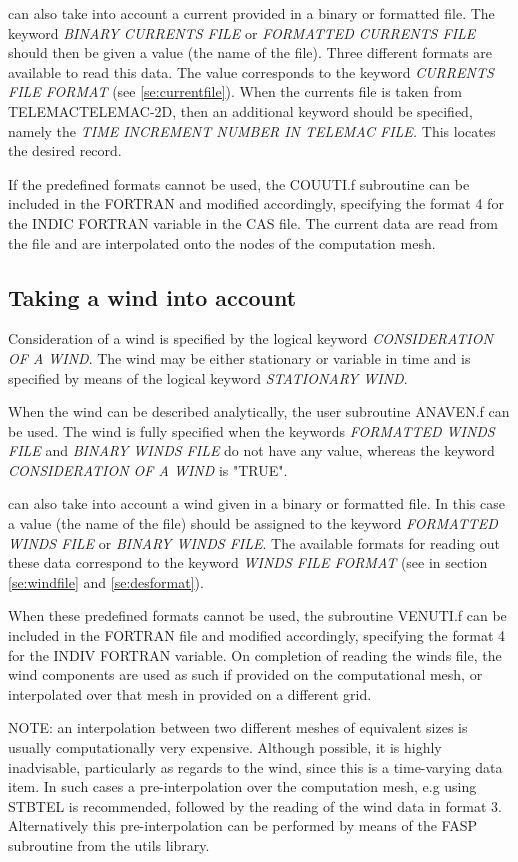 \tomawac can also take into account a current provided in a binary or formatted file. The keyword \textit{BINARY CURRENTS FILE }or\textit{ FORMATTED CURRENTS FILE} should then be given a value (the name of the file). Three different formats are available to read this data. The value corresponds to the keyword \textit{CURRENTS FILE FORMAT} (see \ref{se:currentfile}). When the currents file is taken from TELEMACTELEMAC-2D, then an additional keyword should be specified, namely the \textit{TIME INCREMENT NUMBER IN TELEMAC FILE.} This locates the desired record.

 If the predefined formats cannot be used, the COUUTI.f subroutine can be included in the FORTRAN and modified accordingly, specifying the format 4 for the INDIC FORTRAN variable in the CAS file. The current data are read from the file and are interpolated onto the nodes of the computation mesh.


\subsection{ Taking a wind into account}
\label{se:wind}
 Consideration of a wind is specified by the logical keyword \textit{CONSIDERATION OF A WIND}. The wind may be either stationary or variable in time and is specified by means of the logical keyword \textit{STATIONARY WIND}.

 When the wind can be described analytically, the user subroutine ANAVEN.f can be used. The wind is fully specified when the keywords \textit{FORMATTED WINDS FILE} and \textit{BINARY WINDS FILE} do not have any value, whereas the keyword \textit{CONSIDERATION OF A WIND }is "TRUE".

 \tomawac can also take into account a wind given in a binary or formatted file. In this case a value (the name of the file) should be assigned to the keyword \textit{FORMATTED WINDS FILE }or \textit{BINARY WINDS FILE}. The available formats for reading out these data correspond to the keyword \textit{WINDS FILE FORMAT} (see in section \ref{se:windfile} and \ref{se:desformat}).

 When these predefined formats cannot be used, the subroutine VENUTI.f can be included in the FORTRAN file and modified accordingly, specifying the format 4 for the INDIV FORTRAN variable. On completion of reading the winds file, the wind components are used as such if provided on the computational mesh, or interpolated over that mesh in provided on a different grid.

 NOTE: an interpolation between two different meshes of equivalent sizes is usually computationally very expensive. Although possible, it is highly inadvisable, particularly as regards to the wind, since this is a time-varying data item. In such cases a pre-interpolation over the computation mesh, e.g using STBTEL is recommended, followed by the reading of the wind data in format 3. Alternatively this pre-interpolation can be performed by means of the FASP subroutine from the utils library.


